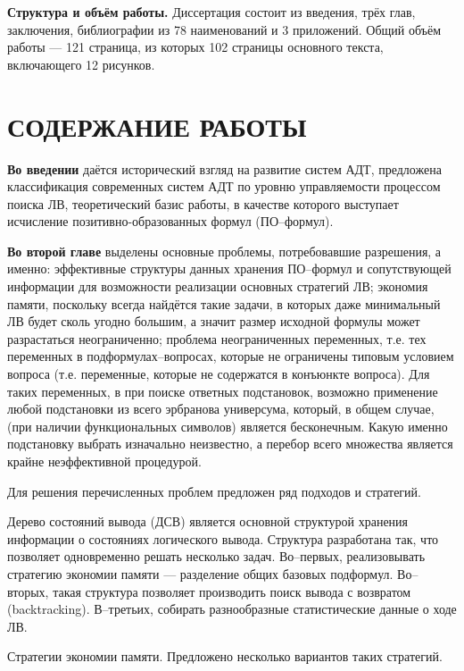 \documentclass[a4paper]{report}
\begin{document}
\textbf{Структура и объём работы.} Диссертация состоит из введения, трёх глав, заключения, библиографии из 78 наименований и 3 приложений. Общий объём работы --- 121 страница, из которых 102 страницы основного текста, включающего 12 рисунков.


\section*{СОДЕРЖАНИЕ РАБОТЫ}

\textbf{Во введении} даётся исторический взгляд на развитие систем АДТ, предложена классификация современных систем АДТ по уровню управляемости процессом поиска ЛВ, теоретический базис работы, в качестве которого выступает исчисление позитивно-образованных формул (ПО--формул).


\textbf{Во второй главе} выделены основные проблемы, потребовавшие разрешения, а именно: эффективные структуры данных хранения ПО--формул и сопутствующей информации для возможности реализации основных стратегий ЛВ; экономия памяти, поскольку всегда найдётся такие задачи, в которых даже минимальный ЛВ будет сколь угодно большим, а значит размер исходной формулы может разрастаться неограниченно; проблема неограниченных переменных, т.е. тех переменных в подформулах--вопросах, которые не ограничены типовым условием вопроса (т.е. переменные, которые не содержатся в конъюнкте вопроса). Для таких переменных, в при поиске ответных подстановок, возможно применение любой подстановки из всего эрбранова универсума, который, в общем случае, (при наличии функциональных символов) является бесконечным. Какую именно подстановку выбрать изначально неизвестно, а перебор всего множества является крайне неэффективной процедурой.

Для решения перечисленных проблем предложен ряд подходов и стратегий.

Дерево состояний вывода (ДСВ) является основной структурой хранения информации о состояниях логического вывода. Структура разработана так, что позволяет одновременно решать несколько задач. Во--первых, реализовывать стратегию экономии памяти --- разделение общих базовых подформул. Во--вторых, такая структура позволяет производить поиск вывода с возвратом (backtracking). В--третьих, собирать разнообразные статистические данные о ходе ЛВ.

Стратегии экономии памяти. Предложено несколько вариантов таких стратегий.
\end{document}
